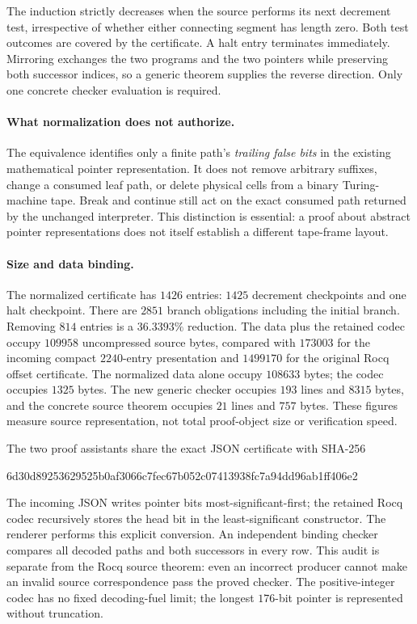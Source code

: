 The induction strictly decreases when the source performs its next decrement
test, irrespective of whether either connecting segment has length zero.
Both test outcomes are covered by the certificate. A halt entry terminates
immediately. Mirroring exchanges the two programs and the two pointers while
preserving both successor indices, so a generic theorem supplies the reverse
direction. Only one concrete checker evaluation is required.

\paragraph{What normalization does not authorize.}
The equivalence identifies only a finite path's \emph{trailing false bits} in
the existing mathematical pointer representation. It does not remove arbitrary
suffixes, change a consumed leaf path, or delete physical cells from a binary
Turing-machine tape. Break and continue still act on the exact consumed path
returned by the unchanged interpreter. This distinction is essential: a proof
about abstract pointer representations does not itself establish a different
tape-frame layout.

\paragraph{Size and data binding.}
The normalized certificate has $1426$ entries: $1425$ decrement checkpoints and
one halt checkpoint. There are $2851$ branch obligations including the initial
branch. Removing $814$ entries is a $36.3393\%$ reduction. The data plus the
retained codec occupy $109958$ uncompressed source bytes, compared with $173003$
for the incoming compact $2240$-entry presentation and $1499170$ for the original
Rocq offset certificate. The normalized data alone occupy $108633$ bytes; the
codec occupies $1325$ bytes. The new generic checker occupies $193$ lines and
$8315$ bytes, and the concrete source theorem occupies $21$ lines and $757$ bytes.
These figures measure source representation, not total proof-object size or
verification speed.

The two proof assistants share the exact JSON certificate with SHA-256
\begin{center}\small\ttfamily
6d30d89253629525b0af3066c7fec67b052c07413938fc7a94dd96ab1ff406e2
\end{center}
The incoming JSON writes pointer bits most-significant-first; the retained Rocq
codec recursively stores the head bit in the least-significant constructor.
The renderer performs this explicit conversion. An independent binding checker
compares all decoded paths and both successors in every row. This audit is
separate from the Rocq source theorem: even an incorrect producer cannot make
an invalid source correspondence pass the proved checker.
The positive-integer codec has no fixed decoding-fuel limit; the longest
$176$-bit pointer is represented without truncation.

